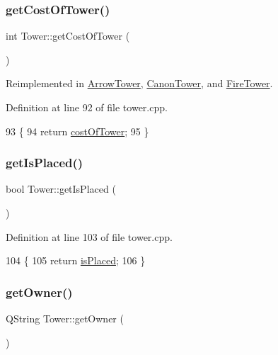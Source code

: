 \subsubsection{\texorpdfstring{get\+Cost\+Of\+Tower()}{getCostOfTower()}}
{\footnotesize\ttfamily int Tower\+::get\+Cost\+Of\+Tower (\begin{DoxyParamCaption}{ }\end{DoxyParamCaption})\hspace{0.3cm}{\ttfamily [virtual]}}



Reimplemented in \hyperlink{class_arrow_tower_a1ef82141056a39071f89d1c360728116}{Arrow\+Tower}, \hyperlink{class_canon_tower_ac0e57d350da509e89e926afe950ab291}{Canon\+Tower}, and \hyperlink{class_fire_tower_a74be102e9bb0871f19fb55b434e2b6d7}{Fire\+Tower}.



Definition at line 92 of file tower.\+cpp.


\begin{DoxyCode}
93 \{
94     \textcolor{keywordflow}{return} \hyperlink{class_tower_ac97e0d44e295399c5cac3cc6e2060df6}{costOfTower};
95 \}
\end{DoxyCode}
\mbox{\label{class_tower_a7632139d282286858bcf80fa0044e19b}} 
\subsubsection{\texorpdfstring{get\+Is\+Placed()}{getIsPlaced()}}
{\footnotesize\ttfamily bool Tower\+::get\+Is\+Placed (\begin{DoxyParamCaption}{ }\end{DoxyParamCaption})}



Definition at line 103 of file tower.\+cpp.


\begin{DoxyCode}
104 \{
105     \textcolor{keywordflow}{return} \hyperlink{class_tower_a1317cf5400c63351e0d66b17df5c0417}{isPlaced};
106 \}
\end{DoxyCode}
\mbox{\label{class_tower_a36d5430c311d9e0509c1c078ca1876dc}} 
\subsubsection{\texorpdfstring{get\+Owner()}{getOwner()}}
{\footnotesize\ttfamily Q\+String Tower\+::get\+Owner (\begin{DoxyParamCaption}{ }\end{DoxyParamCaption})}



